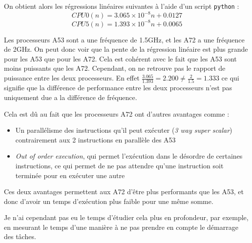 On obtient alors les régressions linéaires suivantes à l'aide d'un script \texttt{python} :
\[
    CPU0(n) =  3.065 \times 10^{-8} n +  0.0127 
\] 
\[
    CPU5(n) =  1.393 \times 10^{-8} n +  0.0065
\]

Les processeurs A53 sont a une fréquence de 1.5GHz, et les A72 a une fréquence de 2GHz. On peut donc voir que la pente de la régression linéaire est plus grande pour les A53 que pour les A72. Cela est cohérent avec le fait que les A53 sont moins puissants que les A72. Cependant, on ne retrouve pas le rapport de puissance entre les deux processeurs. En effet $\frac{3.065}{1.393} = 2.200 \neq \frac{2}{1.5} = 1.333$ ce qui signifie que la différence de performance entre les deux processeurs n'est pas uniquement due a la différence de fréquence.


Cela est dû au fait que les processeurs A72 ont d'autres avantages comme :
\begin{itemize}
    \item Un parallélisme des instructions qu'il peut exécuter (\textit{3 way super scalar}) contrairement aux 2 instructions en parallèle des A53
    \item \textit{Out of order execution}, qui permet l’exécution dans le désordre de certaines instructions, ce qui permet de ne pas attendre qu'une instruction soit terminée pour en exécuter une autre
\end{itemize}

Ces deux avantages permettent aux A72 d'être plus performants que les A53, et donc d'avoir un temps d'exécution plus faible pour une même somme.

Je n'ai cependant pas eu le temps d'étudier cela plus en profondeur, par exemple, en mesurant le temps d'une manière à ne pas prendre en compte le démarrage des tâches. 


